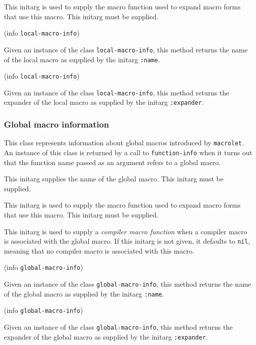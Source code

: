 
This initarg is used to supply the macro function used to expand macro
forms that use this macro.  This initarg must be supplied. 

 {(info {\tt local-macro-info})}

Given an instance of the class \texttt{local-macro-info}, this
method returns the name of the local macro as supplied by the
initarg \texttt{:name}.

 {(info {\tt local-macro-info})}

Given an instance of the class \texttt{local-macro-info}, this
method returns the expander of the local macro as supplied by the
initarg \texttt{:expander}.

\subsubsection{Global macro information}


This class represents information about global macros introduced by
\texttt{macrolet}.  An instance of this class is returned by a call to
\texttt{function-info} when it turns out that the function name passed
as an argument refers to a global macro.


This initarg supplies the name of the global macro.  This initarg
must be supplied.


This initarg is used to supply the macro function used to expand macro
forms that use this macro.  This initarg must be supplied. 


This initarg is used to supply a \emph{compiler macro function} when
a compiler macro is associated with the global macro.  If this
initarg is not given, it defaults to \texttt{nil}, meaning that no
compiler macro is associated with this macro. 

 {(info {\tt global-macro-info})}

Given an instance of the class \texttt{global-macro-info}, this
method returns the name of the global macro as supplied by the
initarg \texttt{:name}.

 {(info {\tt global-macro-info})}

Given an instance of the class \texttt{global-macro-info}, this
method returns the expander of the global macro as supplied by the
initarg \texttt{:expander}.

